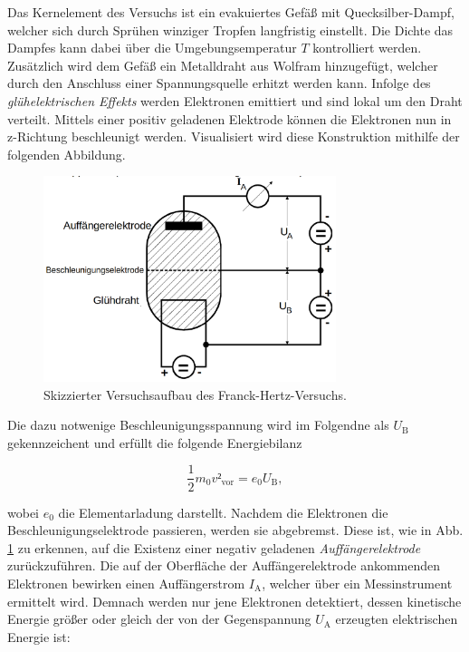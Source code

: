 \noindent Das Kernelement des Versuchs ist ein evakuiertes Gefäß mit Quecksilber-Dampf, welcher sich durch Sprühen winziger Tropfen langfristig einstellt.
Die Dichte das Dampfes kann dabei über die Umgebungsemperatur $T$ kontrolliert werden. Zusätzlich wird dem Gefäß ein Metalldraht aus Wolfram hinzugefügt, welcher 
durch den Anschluss einer Spannungsquelle erhitzt werden kann. Infolge des \emph{glühelektrischen Effekts} werden Elektronen emittiert und sind lokal 
um den Draht verteilt. Mittels einer positiv geladenen Elektrode können die Elektronen nun in z-Richtung beschleunigt werden. Visualisiert wird diese 
Konstruktion mithilfe der folgenden Abbildung.

\begin{figure}[H]
    \centering
    \includegraphics[height=6cm]{content/FH_Skizze.png}
    \caption{Skizzierter Versuchsaufbau des Franck-Hertz-Versuchs\cite{Versuchsanleitung_v601}.}
    \label{fig:FH_Skizze}
\end{figure}

\noindent Die dazu notwenige Beschleunigungsspannung wird im Folgendne als $U_\text{B}$ gekennzeichent und erfüllt die folgende Energiebilanz

\begin{equation*}
    \frac{1}{2}m_0v²_\text{vor} = e_0U_\text{B},
\end{equation*}

\noindent wobei $e_0$ die Elementarladung darstellt. Nachdem die Elektronen die Beschleunigungselektrode passieren, werden sie abgebremst. Diese ist, wie 
in Abb. \ref{fig:FH_Skizze} zu erkennen, auf die Existenz einer negativ geladenen \emph{Auffängerelektrode} zurückzuführen. Die auf der Oberfläche der
Auffängerelektrode ankommenden Elektronen bewirken einen Auffängerstrom $I_\text{A}$, welcher über ein Messinstrument ermittelt wird. Demnach werden nur 
jene Elektronen detektiert, dessen kinetische Energie größer oder gleich der von der Gegenspannung $U_\text{A}$ erzeugten elektrischen Energie ist:


